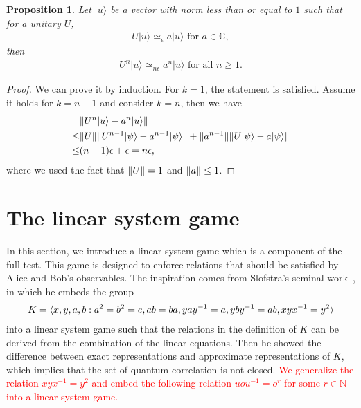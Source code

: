 \documentclass[11pt,letterpaper]{article}
\newcommand{\ket}[1]{|#1\rangle}
\DeclarePairedDelimiter{\norm}{\lVert}{\rVert}
\DeclarePairedDelimiter{\ip}{\langle}{\rangle}
\newcommand{\C}{\mathbb{C}}
\newcommand{\N}{\mathbb{N}}
\newcommand{\1}{\mathbb{1}}
\newcommand{\ep}{\epsilon}
\newcommand{\appd}[1]{\simeq_{#1}}
\newcommand{\hf}[1]{\textcolor{red}{#1}}
\newtheorem{proposition}[theorem]{Proposition}
\theoremstyle{definition}
\begin{document}
\begin{proposition}
	Let $\ket{u}$ be a vector with norm less than or equal to $1$ such that for a unitary $U$,
	\begin{align*}
		U\ket{u} \appd{\ep} a\ket{u} \text{ for } a \in \C,
	\end{align*}
	then
	\begin{align*}
		U^n \ket{u} \appd{n\ep} a^n \ket{u} \text{ for all } n \geq 1.
	\end{align*}
\end{proposition}
\begin{proof}
	We can prove it by induction. 
	For $k=1$, the statement is satisfied.
	Assume it holds for $k = n-1$ and consider $k = n$, then we have
	\begin{align*}
		&\norm{U^n \ket{u} - a^n\ket{u}} \\
		\leq &\norm{U} \norm{U^{n-1} \ket{\psi} - a^{n-1}\ket{\psi}} + \norm{a^{n-1}}
		\norm{U\ket{\psi} - a \ket{\psi}}\\
		\leq &(n-1)\ep + \ep = n \ep,
	\end{align*}
	where we used the fact that $\norm{U} = 1$ and $\norm{a} \leq 1$.
\end{proof}

\section{The linear system game}
\label{sec:lsg}
In this section, we introduce a linear system game which is a component of the full test.
This game is designed to enforce relations that should be satisfied by 
Alice and Bob's observables. The inspiration comes from 
Slofstra's seminal work~\cite{slofstra2017}, in which he
embeds the group
\begin{align}
	K = \ip{ x,y,a,b:a^2=b^2=e, ab=ba, yay^{-1} = a, yby^{-1} = ab, xyx^{-1}=y^2}
\end{align}
into a linear system game such that the relations in the definition of $K$ can be derived from the
combination of the linear equations. Then he showed the difference between exact representations
and approximate representations of $K$, which implies that the set of quantum correlation is not closed.
\hf{We generalize the relation $xyx^{-1} = y^2$ and embed the 
following relation
$
uou^{-1} = o^r 
$
for some $r \in \N$ into a linear system game.}

\end{document}
